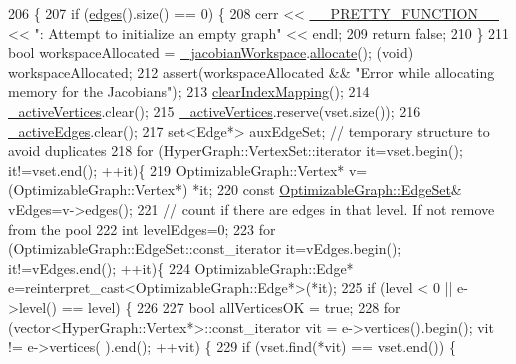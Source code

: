 \begin{DoxyCode}
206                                                                                   \{
207     \textcolor{keywordflow}{if} (\hyperlink{classg2o_1_1HyperGraph_acb3391945ed7c3f09243101d9ef0aaf0}{edges}().size() == 0) \{
208       cerr << \hyperlink{macros_8h_a9c15fe1e91b07ea3280f5239f9841b67}{\_\_PRETTY\_FUNCTION\_\_} << \textcolor{stringliteral}{": Attempt to initialize an empty graph"} << endl;
209       \textcolor{keywordflow}{return} \textcolor{keyword}{false};
210     \}
211     \textcolor{keywordtype}{bool} workspaceAllocated = \hyperlink{structg2o_1_1OptimizableGraph_a161c01a29d09cca22e223ab2048eaba8}{\_jacobianWorkspace}.\hyperlink{classg2o_1_1JacobianWorkspace_a8e1d23ced91b721fdb5bd68c8c4e9fc3}{allocate}(); (void) 
      workspaceAllocated;
212     assert(workspaceAllocated && \textcolor{stringliteral}{"Error while allocating memory for the Jacobians"});
213     \hyperlink{classg2o_1_1SparseOptimizer_ab6f1f4ad2b1fd50b8019c6abb89ac6a8}{clearIndexMapping}();
214     \hyperlink{classg2o_1_1SparseOptimizer_a805e1db97802980fa4dfef95cfa5e63e}{\_activeVertices}.clear();
215     \hyperlink{classg2o_1_1SparseOptimizer_a805e1db97802980fa4dfef95cfa5e63e}{\_activeVertices}.reserve(vset.size());
216     \hyperlink{classg2o_1_1SparseOptimizer_a3207df163943bc1672fc7872964a6d6c}{\_activeEdges}.clear();
217     set<Edge*> auxEdgeSet; \textcolor{comment}{// temporary structure to avoid duplicates}
218     \textcolor{keywordflow}{for} (HyperGraph::VertexSet::iterator it=vset.begin(); it!=vset.end(); ++it)\{
219       OptimizableGraph::Vertex* v= (OptimizableGraph::Vertex*) *it;
220       \textcolor{keyword}{const} \hyperlink{classg2o_1_1HyperGraph_a5e2970e236c0dcb4eff7c205d7b6b4ae}{OptimizableGraph::EdgeSet}& vEdges=v->edges();
221       \textcolor{comment}{// count if there are edges in that level. If not remove from the pool}
222       \textcolor{keywordtype}{int} levelEdges=0;
223       \textcolor{keywordflow}{for} (OptimizableGraph::EdgeSet::const\_iterator it=vEdges.begin(); it!=vEdges.end(); ++it)\{
224         OptimizableGraph::Edge* e=\textcolor{keyword}{reinterpret\_cast<}OptimizableGraph::Edge*\textcolor{keyword}{>}(*it);
225         \textcolor{keywordflow}{if} (level < 0 || e->level() == level) \{
226 
227           \textcolor{keywordtype}{bool} allVerticesOK = \textcolor{keyword}{true};
228           \textcolor{keywordflow}{for} (vector<HyperGraph::Vertex*>::const\_iterator vit = e->vertices().begin(); vit != e->vertices(
      ).end(); ++vit) \{
229             \textcolor{keywordflow}{if} (vset.find(*vit) == vset.end()) \{

\end{DoxyCode}
